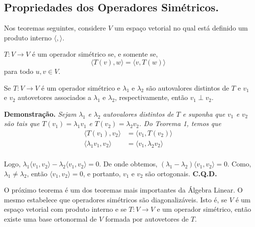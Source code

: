  \subsection{Propriedades dos Operadores Simétricos.}
Nos teoremas seguintes, considere  $V$ um espaço vetorial no qual está definido um produto interno $\langle, \rangle$.

\vspace{0.7cm}
\begin{thm}  $T:  V \rightarrow V$  é um operador simétrico se, e somente se, $$\langle T(v), w \rangle= \langle v, T(w) \rangle$$ para todo $u,v \in V$.
\end{thm}
\vspace{0.7cm}

\begin{thm}  Se $T: V \rightarrow V$ é um operador simétrico e $\lambda_1$ e $\lambda_2$ são autovalores distintos de $T$ e $v_1$ e $v_2$ autovetores associados a  $\lambda_1$ e $\lambda_2$, respectivamente, então $ v_1 \perp v_2$.
\end{thm}
\vspace{0.3cm}

\noindent \textbf{Demonstração.}
\textit{Sejam $\lambda_1$ e $\lambda_2$ autovalores distintos de $T$ e suponha que $v_1$ e $v_2$ são  tais que $T(v_1)=\lambda_1v_1$ e  $T(v_2)=\lambda_2v_2$. Do Teorema 1, temos que}
\begin{align*}
\langle T(v_1), v_2 \rangle &= \langle v_1, T(v_2) \rangle \\
\langle \lambda_1v_1, v_2 \rangle &= \langle v_1, \lambda_2v_2 \rangle \\
 \end{align*}

Logo, $ \lambda_1\langle v_1, v_2 \rangle - \lambda_2 \langle v_1, v_2 \rangle= 0 $. De onde obtemos, $ ( \lambda_1 - \lambda_2) \langle v_1, v_2 \rangle= 0$. Como, $\lambda_1 \neq \lambda_2$, então $\langle v_1, v_2 \rangle= 0$, e portanto, $v_1$ e $v_2$ são ortogonais. \textbf{C.Q.D.}

\vspace{0.7cm}




O próximo teorema é um dos teoremas mais importantes da Álgebra Linear. O mesmo estabelece que operadores simétricos são diagonalizáveis. Isto é, se $V$ é um espaço vetorial com produto interno e se $T:  V \rightarrow V$  e um operador simétrico, então  existe uma base ortonormal de $V$ formada por autovetores de $T$.


